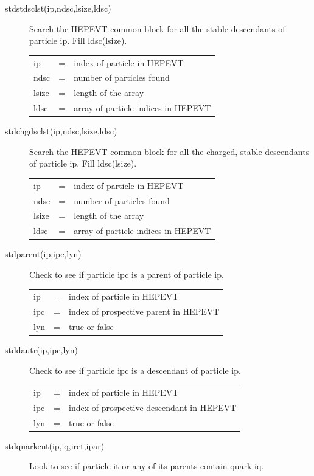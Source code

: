\begin{description}
\item[stdstdsclst(ip,ndsc,lsize,ldsc)]
 Search the HEPEVT common block for all the stable descendants of particle ip.
 Fill ldsc(lsize).

\begin{tabular}{lcl}
ip    & = & index of particle in HEPEVT \\
ndsc  & = & number of particles found \\
lsize & = & length of the array \\
ldsc  & = & array of particle indices in HEPEVT \\
\end{tabular}

\item[stdchgdsclst(ip,ndsc,lsize,ldsc)]
 Search the HEPEVT common block for all the charged, stable
 descendants of particle ip.
 Fill ldsc(lsize).

\begin{tabular}{lcl}
ip    & = & index of particle in HEPEVT \\
ndsc  & = & number of particles found \\
lsize & = & length of the array \\
ldsc  & = & array of particle indices in HEPEVT \\
\end{tabular}

\item[stdparent(ip,ipc,lyn)]
 Check to see if particle ipc is a parent of particle ip.

\begin{tabular}{lcl}
ip   & = & index of particle in HEPEVT \\
ipc  & = & index of prospective parent in HEPEVT \\
lyn  & = & true or false \\
\end{tabular}

\item[stddautr(ip,ipc,lyn)]
 Check to see if particle ipc is a descendant of particle ip.

\begin{tabular}{lcl}
ip   & = & index of particle in HEPEVT \\
ipc  & = & index of prospective descendant in HEPEVT \\
lyn  & = & true or false \\
\end{tabular}

\item[stdquarkcnt(ip,iq,iret,ipar)]
 Look to see if particle it or any of its parents contain quark iq.


\end{description}
